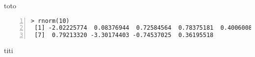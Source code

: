 \documentclass[]{article}
\begin{document}
toto

\begin{Verbatim}[frame=leftline,fontfamily=tt,fontshape=n,numbers=left]
> rnorm(10)
 [1] -2.02225774  0.08376944  0.72584564  0.78375181  0.40060081 -1.76926322
 [7]  0.79213320 -3.30174403 -0.74537025  0.36195518
\end{Verbatim}
titi
\end{document}
